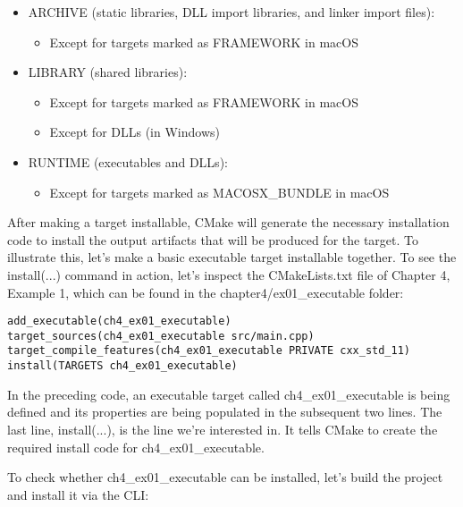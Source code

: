 \begin{itemize}
\item 
ARCHIVE (static libraries, DLL import libraries, and linker import files):

\begin{itemize}
\item 
Except for targets marked as FRAMEWORK in macOS
\end{itemize}

\item 
LIBRARY (shared libraries):

\begin{itemize}
\item 
Except for targets marked as FRAMEWORK in macOS

\item 
Except for DLLs (in Windows)
\end{itemize}

\item 
RUNTIME (executables and DLLs):

\begin{itemize}
\item 
Except for targets marked as MACOSX\_BUNDLE in macOS
\end{itemize}
\end{itemize}

After making a target installable, CMake will generate the necessary installation code to install the output artifacts that will be produced for the target. To illustrate this, let's make a basic executable target installable together. To see the install(...) command in action, let's inspect the CMakeLists.txt file of Chapter 4, Example 1, which can be found in the chapter4/ex01\_executable folder:

\begin{lstlisting}[style=styleCMake]
add_executable(ch4_ex01_executable)
target_sources(ch4_ex01_executable src/main.cpp)
target_compile_features(ch4_ex01_executable PRIVATE cxx_std_11)
install(TARGETS ch4_ex01_executable)
\end{lstlisting}

In the preceding code, an executable target called ch4\_ex01\_executable is being defined and its properties are being populated in the subsequent two lines. The last line, install(...), is the line we're interested in. It tells CMake to create the required install code for ch4\_ex01\_executable.

To check whether ch4\_ex01\_executable can be installed, let's build the project and
install it via the CLI:

